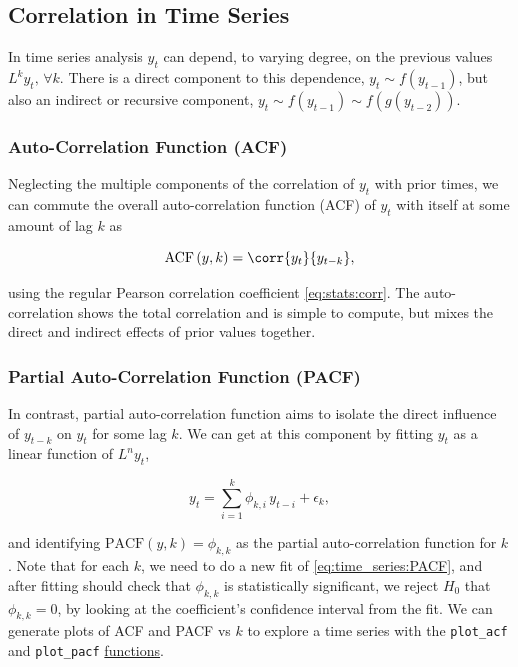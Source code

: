\subsection{Correlation in Time Series}
\label{additional:time_series:correlation}

In time series analysis $y_{t}$ can depend, to varying degree,
on the previous values $L^{k} y_{t},\, \forall k$.
There is a direct component to this dependence,
$y_{t} \sim f\left(y_{t-1}\right)$,
but also an indirect or recursive component,
$y_{t} \sim f\left(y_{t-1}\right) \sim f\left(g\left(y_{t-2}\right)\right)$.

\subsubsection{Auto-Correlation Function (ACF)}
\label{additional:time_series:ACF}

Neglecting the multiple components of the correlation of $y_{t}$ with prior times,
we can commute the overall auto-correlation function (ACF) of $y_{t}$
with itself at some amount of lag $k$ as

\begin{equation}\label{eq:time_series:ACF}
\text{ACF}\left(y,k\right) = \corr{y_{t}}{y_{t-k}},
\end{equation}

\noindent using the regular Pearson correlation coefficient \cref{eq:stats:corr}.
The auto-correlation shows the total correlation and is simple to compute,
but mixes the direct and indirect effects of prior values together.

\subsubsection{Partial Auto-Correlation Function (PACF)}
\label{additional:time_series:PACF}

In contrast, partial auto-correlation function
aims to isolate the direct influence of $y_{t-k}$ on $y_{t}$ for some lag $k$.
We can get at this component by fitting $y_{t}$ as a linear function of $L^{n} y_{t}$,

\begin{equation}\label{eq:time_series:PACF}
y_{t} = \sum_{i=1}^{k} \phi_{k,i}\, y_{t-i} + \epsilon_{k},
\end{equation}

\noindent and identifying $\text{PACF}\left(y,k\right) = \phi_{k,k}$
as the partial auto-correlation function for $k$.
Note that for each $k$, we need to do a new fit of \cref{eq:time_series:PACF},
and after fitting should check that $\phi_{k,k}$ is statistically significant,
\ie we reject $H_{0}$ that $\phi_{k,k}=0$, by looking at the coefficient's confidence interval from the fit.
We can generate plots of ACF and PACF vs $k$ to explore a time series
with the \texttt{plot\_acf} and \texttt{plot\_pacf}
\href{https://www.statsmodels.org/stable/graphics.html\#time-series-plots}{functions}.

